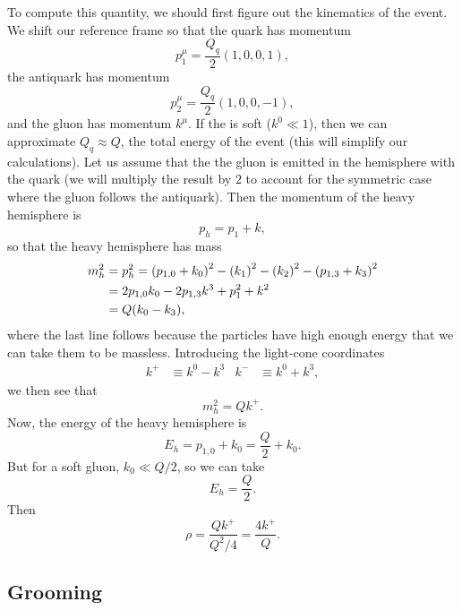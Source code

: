 \documentclass[11pt,twoside,reqno]{amsart}
\theoremstyle{plain}
\theoremstyle{remark}
\theoremstyle{definition}
\theoremstyle{remark}
\theoremstyle{definition}
\theoremstyle{definition}
\begin{document}
	To compute this quantity, we should first figure out the kinematics of the event. We shift our reference frame so that the quark has momentum
	\begin{equation}
		p_1^\mu = \frac{Q_q}{2}(1, 0, 0, 1),
	\end{equation}
	the antiquark has momentum
	\begin{equation}
		p_2^\mu = \frac{Q_q}{2}(1, 0, 0, -1),
	\end{equation}
	and the gluon has momentum $k^\mu$. If the is soft ($k^0 \ll 1$), then we can approximate $Q_q \approx Q$, the total energy of the event (this will simplify our calculations). Let us assume that the the gluon is emitted in the hemisphere with the quark (we will multiply the result by $2$ to account for the symmetric case where the gluon follows the antiquark). Then the momentum of the heavy hemisphere is
	\begin{equation}
		p_h = p_1 + k,
	\end{equation}
	so that the heavy hemisphere has mass
	\begin{align}
		m_h^2 &= p_h^2 = \qty(p_{1,0} + k_0)^2 - \qty(k_1)^2  - \qty(k_2)^2 - \qty(p_{1,3} + k_3)^2 \\
		&= 2p_{1,0} k_0 - 2p_{1,3} k^3 + p_1^2 + k^2 \\
		&= Q\qty(k_0 - k_3),
	\end{align}
	where the last line follows because the particles have high enough energy that we can take them to be massless. Introducing the light-cone coordinates
	\begin{align}\label{eq:light cone}
		k^+ &\equiv k^0 - k^3 & k^- &\equiv  k^0 + k^3,
	\end{align}
	we then see that
	\begin{equation}
		m_h^2 = Q k^+.
	\end{equation}
	Now, the energy of the heavy hemisphere is
	\begin{equation}
		E_h = p_{1, 0} + k_0 = \frac{Q}{2} + k_0.
	\end{equation}
	But for a soft gluon, $k_0 \ll Q/2$, so we can take
	\begin{equation}
		E_h = \frac{Q}{2}.
	\end{equation}
	Then
	\begin{equation}
		\rho = \frac{Q k^+}{Q^2/4} = \frac{4 k^+}{Q}.
	\end{equation}

\subsection{Grooming}
\end{document}
